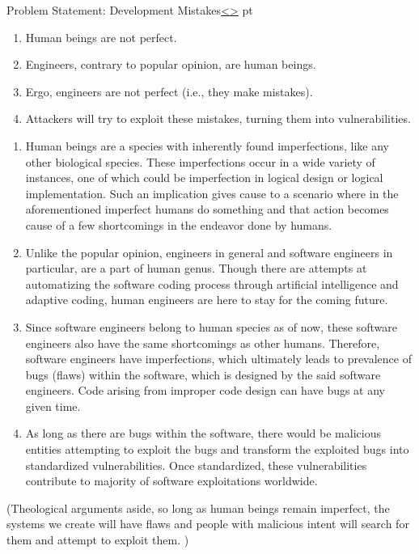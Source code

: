 \documentclass[12pt]{extarticle}
\newenvironment{instructionblock}{\Large\bgroup}{\egroup}
\newcommand{\ben}{\begin{enumerate}}
\newcommand{\een}{\end{enumerate}}
\begin{document}


\pagebreak
\begin{slide}{Problem Statement: Development Mistakes}{\hyperref[slide 3]{\textless}\hyperref[slide 5]{\textgreater}}
	 pt
	\begin{instructionblock}
		\ben
		\item Human beings are not perfect.
		\item Engineers, contrary to popular opinion, are human beings.
		\item Ergo, engineers are not perfect (i.e., they make mistakes).
		\item Attackers will try to exploit these mistakes, turning them into vulnerabilities.
		\een
	\end{instructionblock}
\end{slide}
\vfill

\ben

\item {Human beings are a species with inherently found imperfections, like any other biological species. These imperfections occur in a wide variety of instances, one of which could be imperfection in logical design or logical implementation. Such an implication gives cause to a scenario where in the aforementioned imperfect humans do something and that action becomes cause of a few shortcomings in the endeavor done by humans. }

\item {Unlike the popular opinion, engineers in general and software engineers in particular, are a part of human genus. Though there are attempts at automatizing the software coding process through artificial intelligence and adaptive coding, human engineers are here to stay for the coming future.}

\item {Since software engineers belong to human species as of now, these software engineers also have the same shortcomings as other humans. Therefore, software engineers have imperfections, which ultimately leads to prevalence of bugs (flaws) within the software, which is designed by the said software engineers. Code arising from improper code design can have bugs at any given time. }

\item {As long as there are bugs within the software, there would be malicious entities attempting to exploit the bugs and transform the exploited bugs into standardized vulnerabilities. Once standardized, these vulnerabilities contribute to majority of software exploitations worldwide. }
\een
(Theological arguments aside, so long as human beings remain imperfect, the systems we create will have flaws and people with malicious intent will search for them and attempt to exploit them. )
\end{document}
